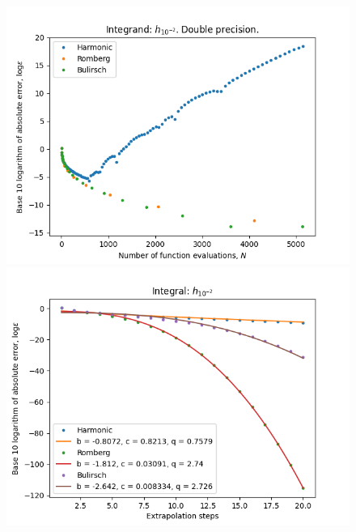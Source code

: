 \begin{figure}[H]
\centering
\begin{minipage}{0.45\textwidth}
\centering
\includegraphics[scale=0.45]{romberg_plots/h_hundredth.png}
\end{minipage}
\begin{minipage}{0.45\textwidth}
\centering
\includegraphics[scale=0.45]{romberg_plots/h_hundredth_hp_steps.png}
\end{minipage}
\end{figure}

